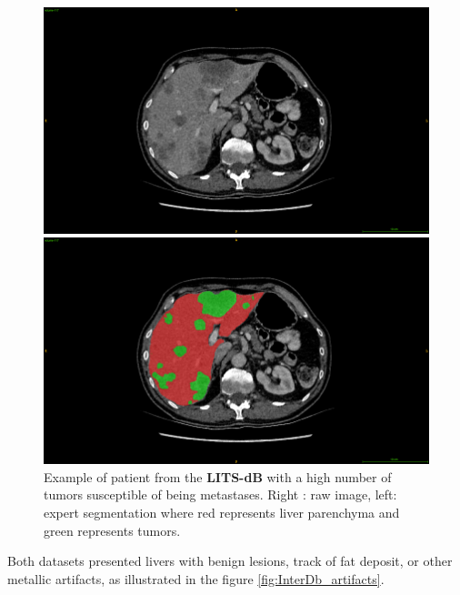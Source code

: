 \documentclass[]{article}
\newcommand{\lmttfont}[1]{{\fontfamily{lmtt}\selectfont #1}}
\begin{document}
\begin{figure}[!ht]
	\centering
	\begin{minipage}{0.45\linewidth}
		\includegraphics[width=\linewidth]{../Contributions/images/ResizeLITS_examplePatientMeta}
	\end{minipage} \hspace{-0.1cm}
	\begin{minipage}{0.45\linewidth}
		\includegraphics[width=\linewidth]{../Contributions/images/ResizeLITS_examplePatientMeta_seg}
	\end{minipage}
	\caption{Example of patient from the \textbf{\lmttfont{LITS-dB}} with a high number of tumors susceptible of being metastases. Right : raw image, left: expert segmentation where red represents liver parenchyma and green represents tumors.}
	\label{fig:litsDb_meta}
\end{figure}
Both datasets presented livers with benign lesions, track of fat deposit, or other metallic artifacts, as illustrated in the figure \ref{fig:InterDb_artifacts}.
\end{document}
